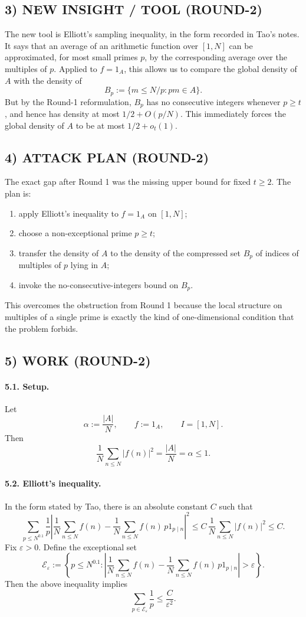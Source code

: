 \subsection*{3) NEW INSIGHT / TOOL (ROUND-2)}
The new tool is Elliott's sampling inequality, in the form recorded in Tao's notes. It says that an average of an arithmetic function over $[1,N]$ can be approximated, for most small primes $p$, by the corresponding average over the multiples of $p$. Applied to $f=1_A$, this allows us to compare the global density of $A$ with the density of
\[
B_p:=\{m\le N/p: pm\in A\}.
\]
But by the Round-1 reformulation, $B_p$ has no consecutive integers whenever $p\ge t$, and hence has density at most $1/2+O(p/N)$. This immediately forces the global density of $A$ to be at most $1/2+o_t(1)$.

\subsection*{4) ATTACK PLAN (ROUND-2)}
The exact gap after Round 1 was the missing upper bound for fixed $t\ge 2$. The plan is:
\begin{enumerate}
\item apply Elliott's inequality to $f=1_A$ on $[1,N]$;
\item choose a non-exceptional prime $p\ge t$;
\item transfer the density of $A$ to the density of the compressed set $B_p$ of indices of multiples of $p$ lying in $A$;
\item invoke the no-consecutive-integers bound on $B_p$.
\end{enumerate}
This overcomes the obstruction from Round 1 because the local structure on multiples of a single prime is exactly the kind of one-dimensional condition that the problem forbids.

\subsection*{5) WORK (ROUND-2)}
\paragraph{5.1. Setup.}
Let
\[
\alpha:=\frac{|A|}{N},\qquad f:=1_A,\qquad I=[1,N].
\]
Then
\[
\frac1N\sum_{n\le N} |f(n)|^2 = \frac{|A|}{N}=\alpha\le 1.
\]

\paragraph{5.2. Elliott's inequality.}
In the form stated by Tao, there is an absolute constant $C$ such that
\[
\sum_{p\le N^{0.1}} \frac1p
\left|
\frac1N\sum_{n\le N} f(n)
-
\frac1N\sum_{n\le N} f(n)\,p1_{p\mid n}
\right|^2
\le C\,\frac1N\sum_{n\le N}|f(n)|^2
\le C.
\]
Fix $\varepsilon>0$. Define the exceptional set
\[
\mathcal E_\varepsilon:=\left\{p\le N^{0.1}:
\left|
\frac1N\sum_{n\le N} f(n)
-
\frac1N\sum_{n\le N} f(n)\,p1_{p\mid n}
\right|>\varepsilon\right\}.
\]
Then the above inequality implies
\[
\sum_{p\in \mathcal E_\varepsilon}\frac1p \le \frac{C}{\varepsilon^2}.
\]

